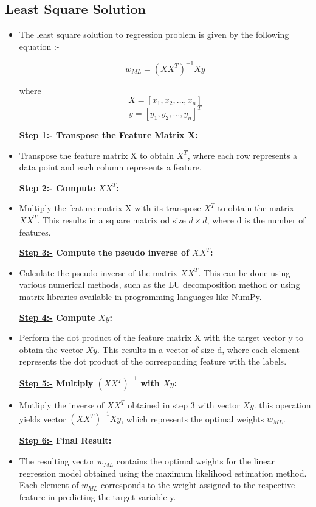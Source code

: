 \documentclass[12pt, a4paper]{article}
\begin{document}
\subsection{Least Square Solution}
\begin{itemize}
    \item \large The least square solution to regression problem is given by the following equation :-
    
    \large \[w_{ML} = (XX^T)^{-1}Xy\]

    \large where 
    \[X = [x_1,x_2,\dots,x_n]\]
    \[y = [y_1,y_2,\dots,y_n]^T\] 

    \large \textbf{\underline{Step 1:-} Transpose the Feature Matrix X:}
    \item \large Transpose the feature matrix X to obtain $X^T$, where each row represents a data point and each column represents a feature. 
    
    \large \textbf{\underline{Step 2:-} Compute $XX^T$:}
    \item \large Multiply the feature matrix X with its transpose $X^T$ to obtain the matrix $XX^T$. This results in a square matrix od size \( d \times d \), where d is the number of features.
    
    \large \textbf{\underline{Step 3:-} Compute the pseudo inverse of $XX^T$:}
    \item \large Calculate the pseudo inverse of the matrix $XX^T$. This can be done using various numerical methods, such as the LU decomposition method or using matrix libraries available in programming languages like NumPy.

    \large \textbf{\underline{Step 4:-} Compute $Xy$:}
    \item \large Perform the dot product of the feature matrix X with the target vector y to obtain the vector $Xy$. This results in a vector of size d, where each element represents the dot product of the corresponding feature with the labels.

    \large \textbf{\underline{Step 5:-} Multiply $(XX^T)^{-1}$ with $Xy$:}
    \item \large Mutliply the inverse of $XX^T$ obtained in step 3 with vector $Xy$. this operation yields vector $(XX^T)^{-1}Xy$, which represents the optimal weights $w_{ML}$.

    \large \textbf{\underline{Step 6:-} Final Result:}
    \item \large The resulting vector $w_{ML}$ contains the optimal weights for the linear regression model obtained using the maximum likelihood estimation method. Each element of $w_{ML}$ corresponds to the weight assigned to the respective feature in predicting the target variable y.
    

\end{itemize}
\end{document}
